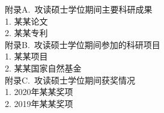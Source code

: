 \appendixuser
{}

\raggedright
{\heiti{} 附录A.~攻读硕士学位期间主要科研成果}\\
1. 某某论文\\
2. 某某专利\\

{\heiti{} 附录B.~攻读硕士学位期间参加的科研项目}\\
1. 某某项目\\
2. 某某国家自然基金\\

{\heiti{} 附录C.~攻读硕士学位期间获奖情况}\\
1. 2020年某某奖项\\
2. 2019年某某奖项\\